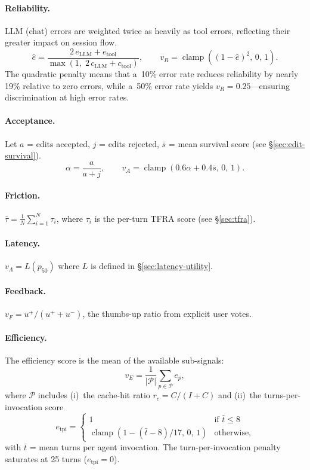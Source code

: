 \documentclass[11pt,a4paper]{article}
\newcommand{\clamp}[3]{\operatorname{clamp}\!\left(#1,\,#2,\,#3\right)}
\begin{document}
\paragraph{Reliability.}
LLM (chat) errors are weighted twice as heavily as tool errors,
reflecting their greater impact on session flow.
\[
  \hat{e} = \frac{2\,e_{\text{LLM}} + e_{\text{tool}}}
                 {\max(1,\;2\,c_{\text{LLM}} + c_{\text{tool}})},
  \qquad
  v_R = \clamp{(1 - \hat{e})^2}{0}{1}.
\]
The quadratic penalty means that a~10\% error rate reduces reliability by
nearly 19\% relative to zero errors, while a~50\% error rate yields
$v_R = 0.25$---ensuring discrimination at high error rates.

\paragraph{Acceptance.}
Let $a$ = edits accepted, $j$ = edits rejected,
$\bar{s}$ = mean survival score (see \S\ref{sec:edit-survival}).
\[
  \alpha = \frac{a}{a+j}, \qquad
  v_A = \clamp{0.6\alpha + 0.4\bar{s}}{0}{1}.
\]

\paragraph{Friction.}
$\bar{\tau} = \frac{1}{N}\sum_{i=1}^N \tau_i$, where $\tau_i$ is the
per-turn TFRA score (see \S\ref{sec:tfra}).

\paragraph{Latency.}
$v_\Lambda = L(p_{50})$ where $L$ is defined in \S\ref{sec:latency-utility}.

\paragraph{Feedback.}
$v_F = u^+ / (u^+ + u^-)$, the thumbs-up ratio from explicit user votes.

\paragraph{Efficiency.}
The efficiency score is the mean of the available sub-signals:
\[
  v_E = \frac{1}{|\mathcal{P}|}\sum_{p \in \mathcal{P}} e_p,
\]
where $\mathcal{P}$ includes (i)~the cache-hit ratio
$r_c = C / (I + C)$ and (ii)~the turns-per-invocation score
\[
  e_{\mathrm{tpi}} = \begin{cases} 1 & \text{if } \bar{t} \leq 8 \\
    \clamp{1 - (\bar{t}-8)/17}{0}{1} & \text{otherwise,} \end{cases}
\]
with $\bar{t}$ = mean turns per agent invocation.  The turn-per-invocation
penalty saturates at 25 turns ($e_{\mathrm{tpi}} = 0$).
\end{document}
